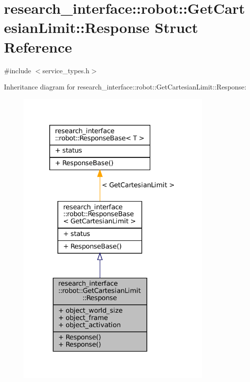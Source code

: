\hypertarget{structresearch__interface_1_1robot_1_1GetCartesianLimit_1_1Response}{}\section{research\+\_\+interface\+:\+:robot\+:\+:Get\+Cartesian\+Limit\+:\+:Response Struct Reference}
\label{structresearch__interface_1_1robot_1_1GetCartesianLimit_1_1Response}


{\ttfamily \#include $<$service\+\_\+types.\+h$>$}



Inheritance diagram for research\+\_\+interface\+:\+:robot\+:\+:Get\+Cartesian\+Limit\+:\+:Response\+:
\nopagebreak
\begin{figure}[H]
\begin{center}
\leavevmode
\includegraphics[width=272pt]{structresearch__interface_1_1robot_1_1GetCartesianLimit_1_1Response__inherit__graph}
\end{center}
\end{figure}


